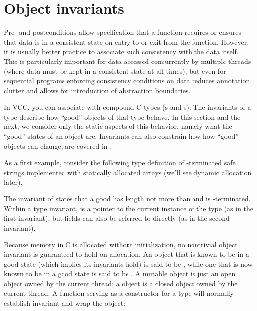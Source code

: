 \section{Object invariants}
\label{sect:invariants}

Pre- and postconditions allow specification that a function requires
or ensures that data is in a consistent state on entry to or exit from
the function. However, it is usually better practice to associate such
consistency with the data itself.  This is particularly important for
data accessed concurrently by multiple threads (where data must be
kept in a consistent state at all times), but even for
sequential programs enforcing consistency conditions on data reduces
annotation clutter and allows for introduction of abstraction
boundaries.

In VCC, you can associate  with compound C types
(s and s).  The invariants of a type describe
how ``good'' objects of that type behave.  In this section and the next,
we consider only the static aspects of this behavior, namely
what the ``good'' states of an object are.  Invariants can also constrain
how how ``good'' objects can change, are covered in
.  


As a first example, consider the following type definition of
-terminated safe strings implemented with statically
allocated arrays (we'll see dynamic allocation later).


\noindent
The invariant of  states that a good 
 has length not more than  and is
-terminated.  Within a type invariant, \vcc{\this} is a pointer
to the current instance of the type (as in the first
invariant), but fields can also be referred to directly (as in the
second invariant). 

Because memory in C is allocated without initialization, no nontrivial
object invariant is guaranteed to hold on allocation. An object that
is known to be in a good state (which implies its invariants hold) is
said to be , while one that is now known to be in a good
state is said to be . A mutable object is just an open
object owned by the current thread; a  object is a closed
object owned by the current thread. A function serving as a
constructor for a type will normally establish invariant and wrap the object:

